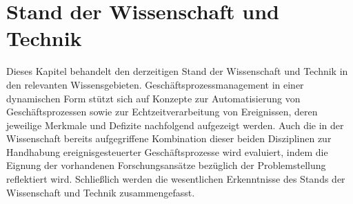 \chapter{Stand der Wissenschaft und Technik}
Dieses Kapitel behandelt den derzeitigen Stand der Wissenschaft und Technik in den relevanten Wissensgebieten. Geschäftsprozessmanagement in einer dynamischen Form stützt sich auf Konzepte zur Automatisierung von Geschäftsprozessen sowie zur Echtzeitverarbeitung von Ereignissen, deren jeweilige Merkmale und Defizite nachfolgend aufgezeigt werden. Auch die in der Wissenschaft bereits aufgegriffene Kombination dieser beiden Disziplinen zur Handhabung ereignisgesteuerter Geschäftsprozesse wird evaluiert, indem die Eignung der vorhandenen Forschungsansätze bezüglich der Problemstellung reflektiert wird. Schließlich werden die wesentlichen Erkenntnisse des Stands der Wissenschaft und Technik zusammengefasst.



